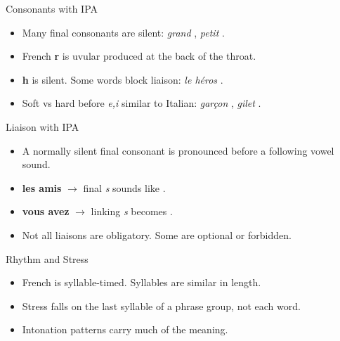 \blueheader
\begin{frame}{Consonants with IPA}
\begin{itemize}
  \item Many final consonants are silent: \textit{grand} \textipa{[gRA\~{}]}, \textit{petit} \textipa{[p@ti]}.
  \item French \textbf{r} is uvular \textipa{[R]} produced at the back of the throat.
  \item \textbf{h} is silent. Some words block liaison: \textit{le h\'eros} \textipa{[l@ eRo]}.
  \item Soft vs hard before \textit{e,i} similar to Italian: \textit{gar\c{c}on} \textipa{[gaRsO\~{}]}, \textit{gilet} \textipa{[ZilE]}.
\end{itemize}

\medskip
{}
\end{frame}

\redheader
\begin{frame}{Liaison with IPA}
\begin{itemize}
  \item A normally silent final consonant is pronounced before a following vowel sound.
  \item \textbf{les amis}   $\to$ final \textit{s} sounds like \textipa{[z]}.
  \item \textbf{vous avez} \textipa{[vu zave]}  $\to$ linking \textit{s} becomes \textipa{[z]}.
  \item Not all liaisons are obligatory. Some are optional or forbidden.
\end{itemize}

\medskip
{}
\end{frame}

\blueheader
\begin{frame}{Rhythm and Stress}
\begin{itemize}
  \item French is syllable-timed. Syllables are similar in length.
  \item Stress falls on the last syllable of a phrase group, not each word.
  \item Intonation patterns carry much of the meaning.
\end{itemize}

\medskip
{}
\end{frame}

